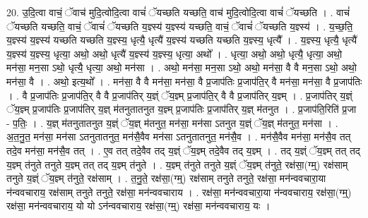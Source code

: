 \documentclass[17pt]{extarticle}
\begin{document}
20. उ॒दि॒त्वा वाचं॒ ॅवाच॑ मुदि॒त्वोदि॒त्वा वाचं॑ ॅयच्छति यच्छति॒ वाच॑ मुदि॒त्वोदि॒त्वा वाचं॑ ॅयच्छति । . वाचं॑ ॅयच्छति यच्छति॒ वाचं॒ ॅवाचं॑ ॅयच्छति य॒ज्ञ्स्य॑ य॒ज्ञ्स्य॑ यच्छति॒ वाचं॒ ॅवाचं॑ ॅयच्छति य॒ज्ञ्स्य॑ । . य॒च्छ॒ति॒ य॒ज्ञ्स्य॑ य॒ज्ञ्स्य॑ यच्छति यच्छति य॒ज्ञ्स्य॒ धृत्यै॒ धृत्यै॑ य॒ज्ञ्स्य॑ यच्छति यच्छति य॒ज्ञ्स्य॒ धृत्यै᳚ । . य॒ज्ञ्स्य॒ धृत्यै॒ धृत्यै॑ य॒ज्ञ्स्य॑ य॒ज्ञ्स्य॒ धृत्या॒ अथो॒ अथो॒ धृत्यै॑ य॒ज्ञ्स्य॑ य॒ज्ञ्स्य॒ धृत्या॒ अथो᳚ । . धृत्या॒ अथो॒ अथो॒ धृत्यै॒ धृत्या॒ अथो॒ मन॑सा॒ मन॒सा ऽथो॒ धृत्यै॒ धृत्या॒ अथो॒ मन॑सा । . अथो॒ मन॑सा॒ मन॒सा ऽथो॒ अथो॒ मन॑सा॒ वै वै मन॒सा ऽथो॒ अथो॒ मन॑सा॒ वै । . अथो॒ इत्य॒थो᳚ । . मन॑सा॒ वै वै मन॑सा॒ मन॑सा॒ वै प्र॒जाप॑तिः प्र॒जाप॑ति॒र् वै मन॑सा॒ मन॑सा॒ वै प्र॒जाप॑तिः । . वै प्र॒जाप॑तिः प्र॒जाप॑ति॒र् वै वै प्र॒जाप॑तिर् य॒ज्ञ्ं ॅय॒ज्ञ्म् प्र॒जाप॑ति॒र् वै वै प्र॒जाप॑तिर् य॒ज्ञ्म् । . प्र॒जाप॑तिर् य॒ज्ञ्ं ॅय॒ज्ञ्म् प्र॒जाप॑तिः प्र॒जाप॑तिर् य॒ज्ञ् म॑तनुतातनुत य॒ज्ञ्म् प्र॒जाप॑तिः प्र॒जाप॑तिर् य॒ज्ञ् म॑तनुत । . प्र॒जाप॑ति॒रिति॑ प्र॒जा - प॒तिः॒ । . य॒ज्ञ् म॑तनुतातनुत य॒ज्ञ्ं ॅय॒ज्ञ् म॑तनुत॒ मन॑सा॒ मन॑सा ऽतनुत य॒ज्ञ्ं ॅय॒ज्ञ् म॑तनुत॒ मन॑सा । . अ॒त॒नु॒त॒ मन॑सा॒ मन॑सा ऽतनुतातनुत॒ मन॑सै॒वैव मन॑सा ऽतनुतातनुत॒ मन॑सै॒व । . मन॑सै॒वैव मन॑सा॒ मन॑सै॒व तत् तदे॒व मन॑सा॒ मन॑सै॒व तत् । . ए॒व तत् तदे॒वैव तद् य॒ज्ञ्ं ॅय॒ज्ञ्म् तदे॒वैव तद् य॒ज्ञ्म् । . तद् य॒ज्ञ्ं ॅय॒ज्ञ्म् तत् तद् य॒ज्ञ्म् त॑नुते तनुते य॒ज्ञ्म् तत् तद् य॒ज्ञ्म् त॑नुते । . य॒ज्ञ्म् त॑नुते तनुते य॒ज्ञ्ं ॅय॒ज्ञ्म् त॑नुते॒ रक्ष॑सा॒(ग्म्॒) रक्ष॑साम् तनुते य॒ज्ञ्ं ॅय॒ज्ञ्म् त॑नुते॒ रक्ष॑साम् । . त॒नु॒ते॒ रक्ष॑सा॒(ग्म्॒) रक्ष॑साम् तनुते तनुते॒ रक्ष॑सा॒ मन॑न्ववचारा॒या न॑न्ववचाराय॒ रक्ष॑साम् तनुते तनुते॒ रक्ष॑सा॒ मन॑न्ववचाराय । . रक्ष॑सा॒ मन॑न्ववचारा॒या न॑न्ववचाराय॒ रक्ष॑सा॒(ग्म्॒) रक्ष॑सा॒ मन॑न्ववचाराय॒ यो यो ऽन॑न्ववचाराय॒ रक्ष॑सा॒(ग्म्॒) रक्ष॑सा॒ मन॑न्ववचाराय॒ यः । \newline
\end{document}
